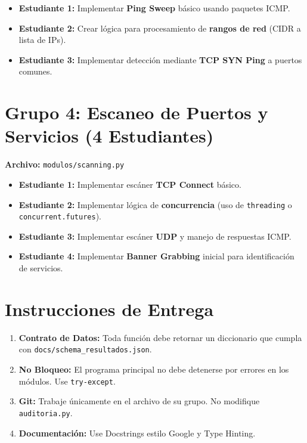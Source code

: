 \documentclass[12pt,a4paper]{article}
\begin{document}
\begin{itemize}[label=$\bullet$]
    \item \textbf{Estudiante 1:} Implementar \textbf{Ping Sweep} básico usando paquetes ICMP.
    \item \textbf{Estudiante 2:} Crear lógica para procesamiento de \textbf{rangos de red} (CIDR a lista de IPs).
    \item \textbf{Estudiante 3:} Implementar detección mediante \textbf{TCP SYN Ping} a puertos comunes.
\end{itemize}

\section{Grupo 4: Escaneo de Puertos y Servicios (4 Estudiantes)}
\textbf{Archivo:} \texttt{modulos/scanning.py}

\begin{itemize}[label=$\bullet$]
    \item \textbf{Estudiante 1:} Implementar escáner \textbf{TCP Connect} básico.
    \item \textbf{Estudiante 2:} Implementar lógica de \textbf{concurrencia} (uso de \texttt{threading} o \texttt{concurrent.futures}).
    \item \textbf{Estudiante 3:} Implementar escáner \textbf{UDP} y manejo de respuestas ICMP.
    \item \textbf{Estudiante 4:} Implementar \textbf{Banner Grabbing} inicial para identificación de servicios.
\end{itemize}

\section{Instrucciones de Entrega}
\begin{enumerate}
    \item \textbf{Contrato de Datos:} Toda función debe retornar un diccionario que cumpla con \texttt{docs/schema\_resultados.json}.
    \item \textbf{No Bloqueo:} El programa principal no debe detenerse por errores en los módulos. Use \texttt{try-except}.
    \item \textbf{Git:} Trabaje únicamente en el archivo de su grupo. No modifique \texttt{auditoria.py}.
    \item \textbf{Documentación:} Use Docstrings estilo Google y Type Hinting.
\end{enumerate}
\end{document}
